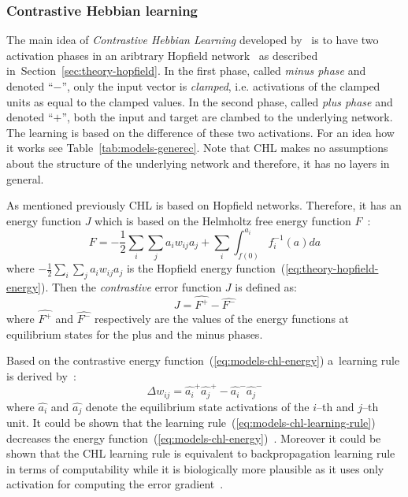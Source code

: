 
\subsubsection{Contrastive Hebbian learning}
\label{sec:models-chl} 

The main idea of \emph{Contrastive Hebbian Learning} developed by~\citet{movellan1990contrastive} is to have two activation phases in an aribtrary Hopfield network~\citep{hopfield1984neurons} as described in~Section~\ref{sec:theory-hopfield}. In the first phase, called \emph{minus phase} and denoted ``$-$'', only the input vector is \emph{clamped}, i.e. activations of the clamped units as equal to the clamped values. In the second phase, called \emph{plus phase} and denoted ``$+$'', both the input and target are clambed to the underlying network. The learning is based on the difference of these two activations. For an idea how it works see Table~\ref{tab:models-generec}. Note that CHL makes no assumptions about the structure of the underlying network and therefore, it has no layers in general. 

\newpage
As mentioned previously CHL is based on Hopfield networks. Therefore, it has an energy function $J$ which is based on the Helmholtz free energy function $F$~\citep{hinton1989deterministic}:
\begin{equation}
  \label{eq:models-chl-helmholtz}
  F = -\frac{1}{2}\sum_i\sum_ja_iw_{ij}a_j + \sum_i \int_{f(0)}^{a_i} f_i^{-1}(a)da
\end{equation} 
where $-\frac{1}{2}\sum_i\sum_ja_iw_{ij}a_j$ is the Hopfield energy function~(\ref{eq:theory-hopfield-energy}). Then the \emph{contrastive} error function $J$ is defined as: 
\begin{equation}
  \label{eq:models-chl-energy}
  J = \hat{F^{+}} - \hat{F^{-}}
\end{equation} 
where $\hat{F^{+}}$ and $\hat{F^{-}}$ respectively are the values of the energy functions at equilibrium states for the plus and the minus phases. 

Based on the contrastive energy function~(\ref{eq:models-chl-energy}) a~learning rule is derived by~\citet{movellan1990contrastive}: 
\begin{equation}
  \label{eq:models-chl-learning-rule}
  \Delta w_{ij} = \hat{a_i}^{+}\hat{a_j}^{+} - \hat{a_i}^{-}\hat{a_j}^{-}
\end{equation}
where $\hat{a_i}$ and $\hat{a_j}$ denote the equilibrium state activations of the $i$--th and $j$--th unit. It could be shown that the learning rule~(\ref{eq:models-chl-learning-rule}) decreases the energy function~(\ref{eq:models-chl-energy})~\citep{movellan1990contrastive}. Moreover it could be shown that the CHL learning rule is equivalent to backpropagation learning rule in terms of computability while it is biologically more plausible as it uses only activation for computing the error gradient~\citep{o1996bio, xie2003equivalence}. 

   
